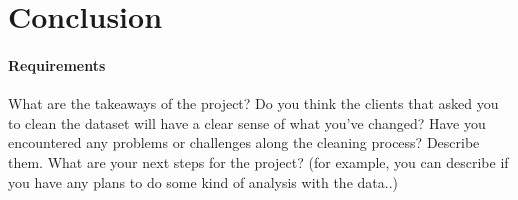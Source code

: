 \section{Conclusion}
\paragraph{Requirements}
What are the takeaways of the project? Do you think the clients that asked you to clean the dataset will have a clear sense of what you've changed? Have you encountered any problems or challenges along the cleaning process? Describe them. What are your next steps for the project? (for example, you can describe if you have any plans to do some kind of analysis with the data..)
